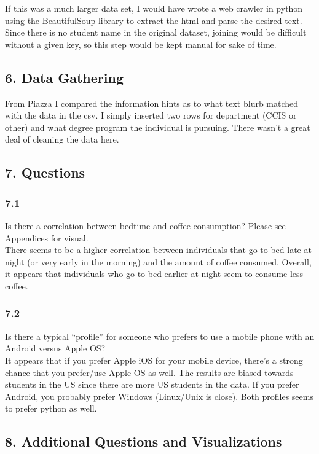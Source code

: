 \documentclass{neu_handout}
\begin{document}
If this was a much larger data set, I would have wrote a web crawler in python using the BeautifulSoup library to extract the html and parse the desired text. Since there is no student name in the original dataset, joining would be difficult without a given key, so this step would be kept manual for sake of time.

\subsection*{6. Data Gathering}
From Piazza I compared the information hints as to what text blurb matched with the data in the csv. I simply inserted two rows for department (CCIS or other) and what degree program the individual is pursuing. There wasn't a great deal of cleaning the data here.

\subsection*{7. Questions}

\subsubsection*{7.1}
Is there a correlation between bedtime and coffee consumption? Please see Appendices for visual.\\

There seems to be a higher correlation between individuals that go to bed late at night (or very early in the morning) and the amount of coffee consumed. Overall, it appears that individuals who go to bed earlier at night seem to consume less coffee.

\subsubsection*{7.2}
Is there a typical “profile” for someone who prefers to use a mobile phone with an Android versus Apple OS?\\

It appears that if you prefer Apple iOS for your mobile device, there's a strong chance that you prefer/use Apple OS as well. The results are biased towards students in the US since there are more US students in the data. If you prefer Android, you probably prefer Windows (Linux/Unix is close). Both profiles seems to prefer python as well.

\subsection*{8. Additional Questions and Visualizations}
\end{document}
